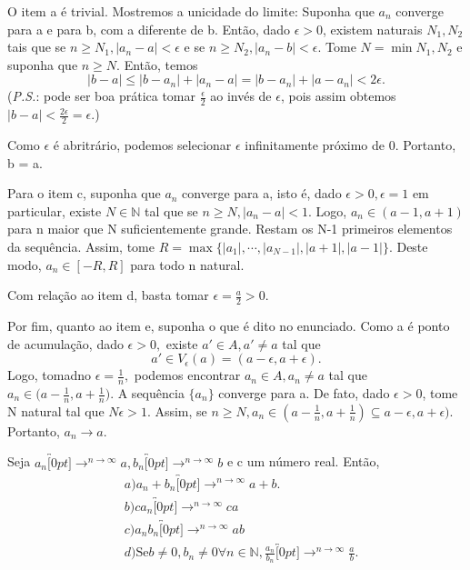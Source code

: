\documentclass[analysis_notes.tex]{subfiles}
\begin{document}
\begin{proof*}
	O item a \'e trivial. Mostremos a unicidade do limite: Suponha que $a_{n}$ converge para a e para b, com a diferente de b. Ent\~ao,
	dado $\epsilon > 0$, existem naturais $N_{1}, N_{2}$ tais que se $n\geq{N_{1}}, |a_{n}-a|<\epsilon$ e se $n\geq{N_{2}}, |a_{n} - b| < \epsilon.$
	Tome $N = \min{N_{1}, N_{2}}$ e suponha que $n \geq{N}.$ Ent\~ao, temos
	$$
		|b - a| \leq{|b - a_{n}| + |a_{n} - a|} = |b - a_{n}| + |a - a_{n}| < 2\epsilon.
	$$
	(\textit{P.S.}: pode ser boa pr\'atica tomar $\frac{\epsilon}{2}$ ao inv\'es de $\epsilon$, pois assim obtemos $|b-a|<\frac{2\epsilon}{2}=\epsilon.$)

	Como $\epsilon$ \'e abritr\'ario, podemos selecionar $\epsilon$ infinitamente pr\'oximo de 0. Portanto, b = a.

	Para o item c, suponha que $a_{n}$ converge para a, isto \'e, dado $\epsilon > 0, \epsilon = 1$ em particular, existe
	$N\in \mathbb{N}$ tal que se $n \geq{N}, |a_{n} - a| < 1$. Logo, $a_{n}\in(a - 1, a + 1)$ para n maior que N suficientemente grande.
	Restam os N-1 primeiros elementos da sequ\^encia. Assim, tome $R = \max{\biggl\{|a_{1}|, \cdots, |a_{N-1}|, |a + 1|, |a - 1|\biggr\}}$. Deste modo,
	$a_{n}\in[-R, R]$ para todo n natural.

	Com rela\c c\~ao ao item d, basta tomar $\epsilon = \frac{a}{2} > 0.$

	Por fim, quanto ao item e, suponha o que \'e dito no enunciado. Como a \'e ponto de acumula\c c\~ao, dado $\epsilon > 0,$ existe
	$a'\in{A}, a'\neq a$ tal que
	$$
		a'\in V_{\epsilon}(a) = (a - \epsilon, a + \epsilon).
	$$
	Logo, tomadno $\epsilon = \frac{1}{n},$ podemos encontrar $a_{n}\in A, a_{n}\neq a$ tal que $a_{n}\in\biggl(a-\frac{1}{n}, a + \frac{1}{n}\biggr)$. A sequ\^encia
	$\{a_{n}\}$ converge para a. De fato, dado $\epsilon > 0$, tome N natural tal que $N\epsilon > 1.$ Assim, se $n\geq{N}, a_{n}\in(a-\frac{1}{n}, a+\frac{1}{n})\subseteq{a-\epsilon}, a+\epsilon)$.
	Portanto, $a_{n}\rightarrow a.$ \qedsymbol
\end{proof*}
\begin{theorem*}
	Seja $a_{n}\overbracket[0pt]{\longrightarrow}^{n\to\infty}a, b_{n}\overbracket[0pt]{\rightarrow}^{n\to\infty}b$ e c um n\'umero real. Ent\~ao,
	\begin{align*}
		 & a) a_{n} + b_{n}\overbracket[0pt]{\longrightarrow}^{n\to\infty} a + b.                                                                \\
		 & b) ca_{n}\overbracket[0pt]{\longrightarrow}^{n\to\infty} ca                                                                           \\
		 & c) a_{n}b_{n}\overbracket[0pt]{\longrightarrow}^{n\to\infty} ab                                                                       \\
		 & d)\text{Se} b\neq0, b_{n}\neq0\forall n\in \mathbb{N}, \frac{a_{n}}{b_{n}}\overbracket[0pt]{\longrightarrow}^{n\to\infty}\frac{a}{b}.
	\end{align*}
\end{theorem*}
\end{document}
